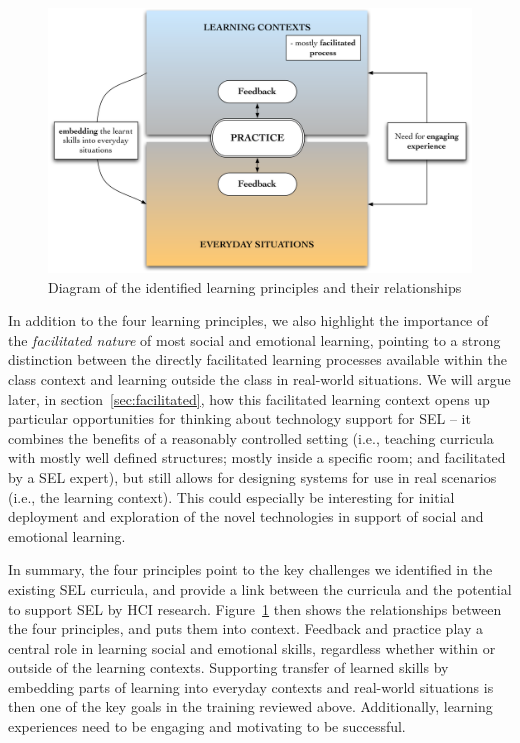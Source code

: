 \documentclass[prodmode,acmtochi]{acmsmall}
\begin{document}
\begin{figure}
  \centering
        \includegraphics[width=\textwidth]{images/challenges}
        \caption{Diagram of the identified learning  principles and their relationships}
        \label{fig:sum-challenges}
\end{figure}



\smallskip

In addition to the four learning principles, we also highlight the importance of the \emph{facilitated nature} of most social and emotional learning, pointing to a strong distinction between the directly facilitated learning processes available within the class context and learning outside the class in real-world situations. We will argue later, in section~\ref{sec:facilitated}, how this facilitated learning context opens up particular opportunities for thinking about technology support for SEL -- it combines the benefits of a reasonably controlled setting (i.e., teaching curricula with mostly well defined structures; mostly inside a specific room; and facilitated by a SEL expert), but still allows for designing systems for use in real scenarios (i.e., the learning context). This could especially be interesting for initial deployment and exploration of the novel technologies in support of social and emotional learning. 

\smallskip
In summary, the four principles point to the key challenges we identified in the existing SEL curricula, and provide a link between the curricula and the potential to support SEL by HCI research. Figure~\ref{fig:sum-challenges} then shows the relationships between the four principles, and puts them into context. Feedback and practice play a central role in learning social and emotional skills, regardless whether within or outside of the learning contexts. Supporting transfer of learned skills by embedding parts of learning into everyday contexts and real-world situations is then one of the key goals in the training reviewed above. Additionally, learning experiences need to be engaging and motivating to be successful. 
\end{document}
